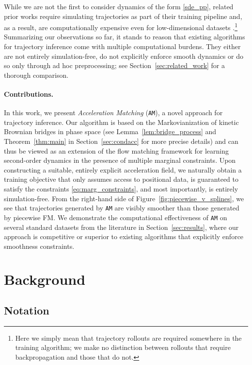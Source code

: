 \documentclass[12pt]{article}
\theoremstyle{plain}
\theoremstyle{plain}
\theoremstyle{remark}
\newcommand{\1}{\bm{1}}
\theoremstyle{plain}
\theoremstyle{definition}
\theoremstyle{remark}
\begin{document}
While we are not the first to consider dynamics of the form \eqref{sde_pp}, related prior works require simulating trajectories as part of their training pipeline and, as a result, are computationally expensive even for low-dimensional datasets \citep{chen2023deep,theodoropoulos2025momentum}.\footnote{Here we simply mean that trajectory rollouts are required somewhere in the training algorithm; we make no distinction between rollouts that require backpropagation and those that do not.} Summarizing our observations so far, it stands to reason that existing algorithms for trajectory inference come with multiple computational burdens. They either are not entirely simulation-free, do not explicitly enforce smooth dynamics or do so only through ad hoc preprocessing; see Section~\ref{sec:related_work} for a thorough comparison.

\paragraph{Contributions.}
In this work, we present \emph{Acceleration Matching} (\texttt{AM}), a novel approach for trajectory inference. Our algorithm is based on the Markovianization of kinetic Brownian bridges in phase space (see Lemma~\ref{lem:bridge_process} and Theorem~\ref{thm:main} in Section~\ref{sec:condacc} for more precise details) and can thus be viewed as an extension of the  flow matching framework \citep{lipman2022flow,albergo2022building,liu2022flow} for learning second-order dynamics in the presence of multiple marginal constraints. Upon constructing a suitable, entirely explicit acceleration field, we naturally obtain a training objective that only assumes access to positional data, is guaranteed to satisfy the constraints \eqref{eq:marg_constraints}, and most importantly, is entirely simulation-free.
From the right-hand side of Figure~\ref{fig:piecewise_v_splines}, we see that trajectories generated by \texttt{AM} are visibly smoother than those generated by piecewise FM.
We demonstrate the computational effectiveness of \texttt{AM} on several standard datasets from the literature in Section~\ref{sec:results}, where our approach is competitive or superior to existing algorithms that explicitly enforce smoothness constraints.




\section{Background}\label{sec:prelim}
\subsection{Notation}
\end{document}
